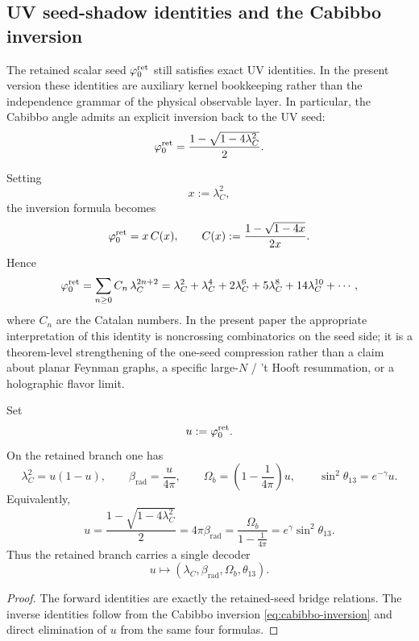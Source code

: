 \subsection{UV seed-shadow identities and the Cabibbo inversion}

The retained scalar seed $\varphi_0^{\mathrm{ret}}$ still satisfies exact UV identities. In the present version these
identities are auxiliary kernel bookkeeping rather than the independence grammar of the physical
observable layer. In particular, the Cabibbo angle admits an explicit inversion back to the UV
seed:
\begin{equation}
\label{eq:cabibbo-inversion}
\varphi_0^{\mathrm{ret}}=\frac{1-\sqrt{1-4\lambda_C^2}}{2}.
\end{equation}
\begin{remark}
Setting
\[
x:=\lambda_C^2,
\]
the inversion formula becomes
\[
\varphi_0^{\mathrm{ret}}=x\,C(x),
\qquad
C(x):=\frac{1-\sqrt{1-4x}}{2x}.
\]
Hence
\begin{equation}
\label{eq:catalan-cabibbo}
\varphi_0^{\mathrm{ret}}
=
\sum_{n\ge 0} C_n\,\lambda_C^{2n+2}
=
\lambda_C^2+\lambda_C^4+2\lambda_C^6+5\lambda_C^8+14\lambda_C^{10}+\cdots,
\end{equation}
where $C_n$ are the Catalan numbers. In the present paper the appropriate interpretation of this
identity is noncrossing combinatorics on the seed side; it is a theorem-level strengthening of
the one-seed compression rather than a claim about planar Feynman graphs, a specific large-$N$ /
't Hooft resummation, or a holographic flavor limit.
\end{remark}

\begin{proposition}
\label{prop:retained-seed-decoder}
Set
\[
u:=\varphi_0^{\mathrm{ret}}.
\]
On the retained branch one has
\[
\lambda_C^2=u(1-u),
\qquad
\beta_{\mathrm{rad}}=\frac{u}{4\pi},
\qquad
\Omega_b=\left(1-\frac{1}{4\pi}\right)u,
\qquad
\sin^2\theta_{13}=e^{-\gamma}u.
\]
Equivalently,
\[
u
=
\frac{1-\sqrt{1-4\lambda_C^2}}{2}
=
4\pi\beta_{\mathrm{rad}}
=
\frac{\Omega_b}{1-\frac{1}{4\pi}}
=
e^\gamma\sin^2\theta_{13}.
\]
Thus the retained branch carries a single decoder
\[
u\longmapsto (\lambda_C,\beta_{\mathrm{rad}},\Omega_b,\theta_{13}).
\]
\end{proposition}

\begin{proof}
The forward identities are exactly the retained-seed bridge relations. The inverse identities follow
from the Cabibbo inversion \eqref{eq:cabibbo-inversion} and direct elimination of $u$ from the same
four formulas.
\end{proof}

